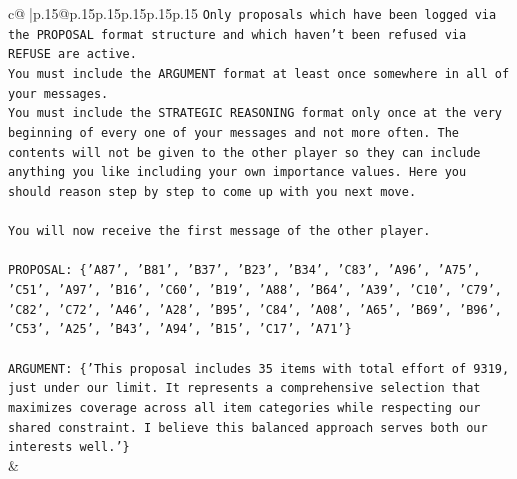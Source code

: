 \documentclass{article}
\begin{document}
{\begin{supertabular}{c@{$\;$}|p{.15\linewidth}@{}p{.15\linewidth}p{.15\linewidth}p{.15\linewidth}p{.15\linewidth}p{.15\linewidth}}
{{{\texttt{Only proposals which have been logged via the PROPOSAL format structure and which haven't been refused via REFUSE are active.} \\
\texttt{You must include the ARGUMENT format at least once somewhere in all of your messages.} \\
\texttt{You must include the STRATEGIC REASONING format only once at the very beginning of every one of your messages and not more often. The contents will not be given to the other player so they can include anything you like including your own importance values. Here you should reason step by step to come up with you next move.} \\
\\ 
\texttt{You will now receive the first message of the other player.} \\
\\ 
\texttt{PROPOSAL: \{'A87', 'B81', 'B37', 'B23', 'B34', 'C83', 'A96', 'A75', 'C51', 'A97', 'B16', 'C60', 'B19', 'A88', 'B64', 'A39', 'C10', 'C79', 'C82', 'C72', 'A46', 'A28', 'B95', 'C84', 'A08', 'A65', 'B69', 'B96', 'C53', 'A25', 'B43', 'A94', 'B15', 'C17', 'A71'\}} \\
\\ 
\texttt{ARGUMENT: \{'This proposal includes 35 items with total effort of 9319, just under our limit. It represents a comprehensive selection that maximizes coverage across all item categories while respecting our shared constraint. I believe this balanced approach serves both our interests well.'\}} \\
            }
        }
    }
    & \\ \\


\end{supertabular}}
\end{document}
